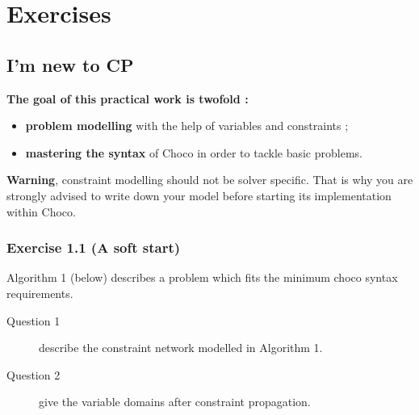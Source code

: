 \label{exercises}
\hypertarget{exercises}{}

\chapter{Exercises}\label{exercises:exercises}\hypertarget{exercises:exercises}{}

\section{I'm new to CP}\label{exercises:i'mnewtocp}\hypertarget{exercises:i'mnewtocp}{}

\begin{note}
\textbf{The goal of this practical work is twofold :}
\begin{itemize}
	\item \textbf{problem modelling} with the help of variables and constraints ;
	\item \textbf{mastering the syntax} of Choco in order to tackle basic problems.
\end{itemize}

\textbf{Warning}, constraint modelling should not be solver specific. That is why you are strongly advised to write down your model before starting its implementation within Choco. %

\end{note}

\subsection{Exercise 1.1 (A soft start)}\label{exercises:exercise1.1}\hypertarget{exercises:exercise1.1}{}

Algorithm 1 (below) describes a problem which fits the minimum choco syntax requirements.
\begin{description}
	\item[Question 1] describe the constraint network modelled in Algorithm 1.
	\item[Question 2] give the variable domains after constraint propagation.
\end{description}

